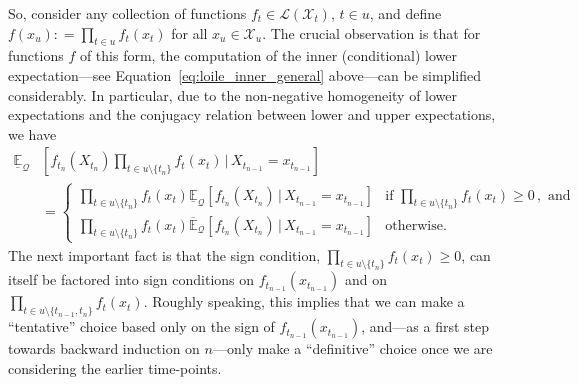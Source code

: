 \documentclass[3p]{elsarticle}
\newcommand{\states}{\mathcal{X}}
\newcommand{\gambles}{\mathcal{L}}
\newcommand{\rateset}{\mathcal{Q}}
\newcommand{\coloneqq}{:\!=}
\begin{document}
So, consider any collection of functions $f_t\in\gambles(\states_t)$, $t\in u$, and define $f(x_u)\coloneqq \prod_{t\in u}f_t(x_t)$ for all $x_u\in\states_u$. The crucial observation is that for functions $f$ of this form, the computation of the inner (conditional) lower expectation---see Equation~\eqref{eq:loile_inner_general} above---can be simplified considerably. In particular, due to the non-negative homogeneity of lower expectations and the conjugacy relation between lower and upper expectations, we have
\begin{align*}
\underline{\mathbb{E}}_{\rateset}&\left[f_{t_n}(X_{t_n})\prod_{t\in u\setminus\{t_n\}}f_t(x_t)\,\Bigg\vert\,X_{t_{n-1}}=x_{t_{n-1}}\right] \\
 &= \left\{\begin{array}{ll}
\prod_{t\in u\setminus\{t_n\}}f_t(x_t)\underline{\mathbb{E}}_{\rateset}\left[f_{t_n}(X_{t_n})\,\big\vert\,X_{t_{n-1}}=x_{t_{n-1}}\right] & \text{if } \prod_{t\in u\setminus\{t_n\}}f_t(x_t) \geq 0\,,\text{ and}\\
\prod_{t\in u\setminus\{t_n\}}f_t(x_t)\overline{\mathbb{E}}_{\rateset}\left[f_{t_n}(X_{t_n})\,\big\vert\,X_{t_{n-1}}=x_{t_{n-1}}\right] & \text{otherwise.}
\end{array}\right.
\end{align*}
The next important fact is that the sign condition, $\prod_{t\in u\setminus\{t_n\}}f_t(x_t) \geq 0$, can itself be factored into sign conditions on $f_{t_{n-1}}(x_{t_{n-1}})$ and on $\prod_{t\in u\setminus\{t_{n-1},t_n\}}f_t(x_t)$. Roughly speaking, this implies that we can make a ``tentative'' choice based only on the sign of $f_{t_{n-1}}(x_{t_{n-1}})$, and---as a first step towards backward induction on $n$---only make a ``definitive'' choice once we are considering the earlier time-points.
\end{document}
